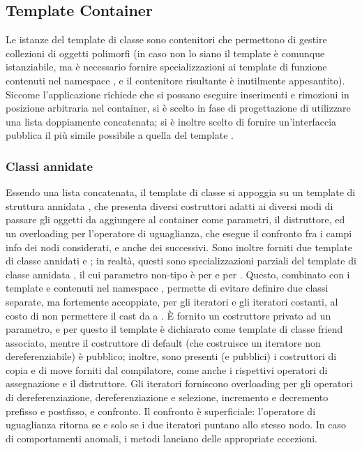\subsection{Template Container} %
\label{sub:template_container}
Le istanze del template di classe  sono contenitori che permettono di gestire collezioni di oggetti polimorfi (in caso non lo siano il template è comunque istanziabile, ma è necessario fornire specializzazioni ai template di funzione contenuti nel namespace , e il contenitore risultante è inutilmente appesantito). Siccome l'applicazione richiede che si possano eseguire inserimenti e rimozioni in posizione arbitraria nel container, si è scelto in fase di progettazione di utilizzare una lista doppiamente concatenata; si è inoltre scelto di fornire un'interfaccia pubblica il più simile possibile a quella del template .
\subsubsection{Classi annidate} %
\label{ssub:classi_annidate}
Essendo una lista concatenata, il template di classe si appoggia su un template di struttura annidata , che presenta diversi costruttori adatti ai diversi modi di passare gli oggetti da aggiungere al container come parametri, il distruttore, ed un overloading per l'operatore di uguaglianza, che esegue il confronto fra i campi info dei nodi considerati, e anche dei successivi. Sono inoltre forniti due template di classe annidati  e ; in realtà, questi sono specializzazioni parziali del template di classe annidata , il cui parametro non-tipo è  per  e  per . Questo, combinato con i template  e  contenuti nel namespace , permette di evitare definire due classi separate, ma fortemente accoppiate, per gli iteratori e gli iteratori costanti, al costo di non permettere il cast da  a . È fornito un costruttore privato ad un parametro, e per questo il template  è dichiarato come template di classe friend associato, mentre il costruttore di default (che costruisce un iteratore non dereferenziabile) è pubblico; inoltre, sono presenti (e pubblici) i costruttori di copia e di move forniti dal compilatore, come anche i rispettivi operatori di assegnazione e il distruttore. Gli iteratori forniscono overloading per gli operatori di dereferenziazione, dereferenziazione e selezione, incremento e decremento prefisso e postfisso, e confronto. Il confronto è superficiale: l'operatore di uguaglianza ritorna  se e solo se i due iteratori puntano allo stesso nodo. In caso di comportamenti anomali, i metodi lanciano delle appropriate eccezioni.
